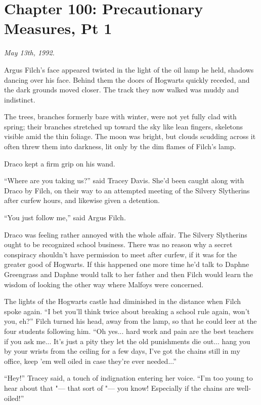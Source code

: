 \chapter{Chapter 100: Precautionary Measures, Pt 1}
\emph{May 13th, 1992.}

Argus Filch's face appeared twisted in the light of the oil lamp he
held, shadows dancing over his face. Behind them the doors of Hogwarts
quickly receded, and the dark grounds moved closer. The track they now
walked was muddy and indistinct.

The trees, branches formerly bare with winter, were not yet fully clad
with spring; their branches stretched up toward the sky like lean
fingers, skeletons visible amid the thin foliage. The moon was bright,
but clouds scudding across it often threw them into darkness, lit only
by the dim flames of Filch's lamp.

Draco kept a firm grip on his wand.

``Where are you taking us?'' said Tracey Davis. She'd been caught along
with Draco by Filch, on their way to an attempted meeting of the Silvery
Slytherins after curfew hours, and likewise given a detention.

``You just follow me,'' said Argus Filch.

Draco was feeling rather annoyed with the whole affair. The Silvery
Slytherins ought to be recognized school business. There was no reason
why a secret conspiracy shouldn't have permission to meet after curfew,
if it was for the greater good of Hogwarts. If this happened one more
time he'd talk to Daphne Greengrass and Daphne would talk to her father
and then Filch would learn the wisdom of looking the other way where
Malfoys were concerned.

The lights of the Hogwarts castle had diminished in the distance when
Filch spoke again. ``I bet you'll think twice about breaking a school
rule again, won't you, eh?'' Filch turned his head, away from the lamp,
so that he could leer at the four students following him. ``Oh
yes... hard work and pain are the best teachers if you ask
me... It's just a pity they let the old punishments die out...
hang you by your wrists from the ceiling for a few days, I've got the
chains still in my office, keep 'em well oiled in case they're ever
needed...''

``Hey!'' Tracey said, a touch of indignation entering her voice. ``I'm
too young to hear about that "--- that sort of "--- you know! Especially if
the chains are well-oiled!''

